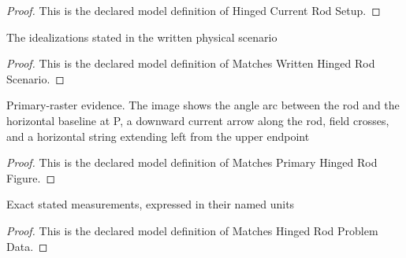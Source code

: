\begin{proof}
  This is the declared model definition of Hinged Current Rod Setup.
\end{proof}
\begin{definition}
  \label{def:physics:phyx-mini-0953:phyxminiproblems-problemphyxmini0953-matcheswrittenhingedrodscenario}
  The idealizations stated in the written physical scenario
\end{definition}
\begin{proof}
  This is the declared model definition of Matches Written Hinged Rod Scenario.
\end{proof}
\begin{definition}
  \label{def:physics:phyx-mini-0953:phyxminiproblems-problemphyxmini0953-matchesprimaryhingedrodfigure}
  Primary-raster evidence. The image shows the angle arc between the rod and the horizontal baseline at P, a downward current arrow along the rod, field crosses, and a horizontal string extending left from the upper endpoint
\end{definition}
\begin{proof}
  This is the declared model definition of Matches Primary Hinged Rod Figure.
\end{proof}
\begin{definition}
  \label{def:physics:phyx-mini-0953:phyxminiproblems-problemphyxmini0953-matcheshingedrodproblemdata}
  Exact stated measurements, expressed in their named units
\end{definition}
\begin{proof}
  This is the declared model definition of Matches Hinged Rod Problem Data.
\end{proof}
